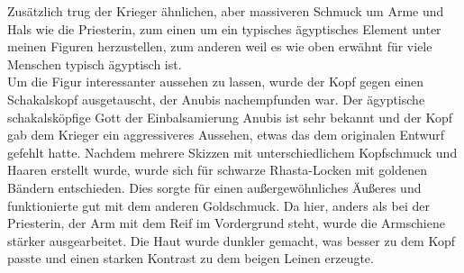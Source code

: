 \documentclass[extern,palatino]{cgBA}
\begin{document}
Zusätzlich trug der Krieger ähnlichen, aber massiveren Schmuck um Arme und Hals wie die Priesterin, zum einen um ein typisches ägyptisches Element unter meinen Figuren herzustellen, zum anderen weil es wie oben erwähnt für viele Menschen typisch ägyptisch ist. 
\\Um die Figur interessanter aussehen zu lassen, wurde der Kopf gegen einen Schakalskopf ausgetauscht, der Anubis nachempfunden war. Der ägyptische schakalsköpfige Gott der Einbalsamierung Anubis ist sehr bekannt und der Kopf gab dem Krieger ein aggressiveres Aussehen, etwas das dem originalen Entwurf gefehlt hatte. Nachdem mehrere Skizzen mit unterschiedlichem Kopfschmuck und Haaren erstellt wurde, wurde sich für schwarze Rhasta-Locken mit goldenen Bändern entschieden. Dies sorgte für einen außergewöhnliches Äußeres und funktionierte gut mit dem anderen Goldschmuck.
Da hier, anders als bei der Priesterin, der Arm mit dem Reif im Vordergrund steht, wurde die Armschiene stärker ausgearbeitet. Die Haut wurde dunkler gemacht, was besser zu dem Kopf passte und einen starken Kontrast zu dem beigen Leinen erzeugte.
\newpage
\end{document}
